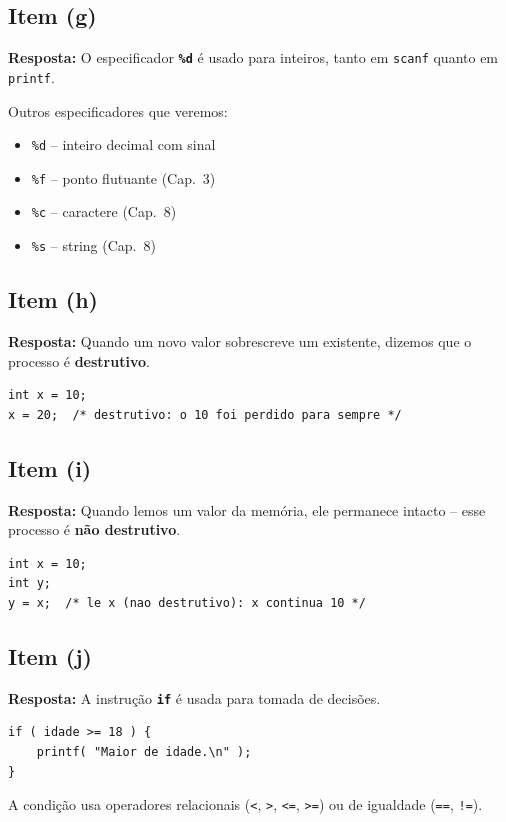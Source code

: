 \documentclass[12pt,a4paper]{article}
\begin{document}
\subsection*{Item (g)}
\begin{respostabox}
\textbf{Resposta:} O especificador \textcolor{deitelblue}{\textbf{\texttt{\%d}}}
é usado para inteiros, tanto em \texttt{scanf} quanto em \texttt{printf}.

Outros especificadores que veremos:
\begin{itemize}[noitemsep]
  \item \texttt{\%d} -- inteiro decimal com sinal
  \item \texttt{\%f} -- ponto flutuante (Cap.~3)
  \item \texttt{\%c} -- caractere (Cap.~8)
  \item \texttt{\%s} -- string (Cap.~8)
\end{itemize}
\end{respostabox}

\subsection*{Item (h)}
\begin{respostabox}
\textbf{Resposta:} Quando um novo valor sobrescreve um existente, dizemos que o
processo é \textcolor{deitelblue}{\textbf{destrutivo}}.

\begin{lstlisting}
int x = 10;
x = 20;  /* destrutivo: o 10 foi perdido para sempre */
\end{lstlisting}
\end{respostabox}

\subsection*{Item (i)}
\begin{respostabox}
\textbf{Resposta:} Quando lemos um valor da memória, ele permanece intacto -- esse
processo é \textcolor{deitelblue}{\textbf{não destrutivo}}.

\begin{lstlisting}
int x = 10;
int y;
y = x;  /* le x (nao destrutivo): x continua 10 */
\end{lstlisting}
\end{respostabox}

\subsection*{Item (j)}
\begin{respostabox}
\textbf{Resposta:} A instrução \textcolor{deitelblue}{\textbf{\texttt{if}}} é
usada para tomada de decisões.

\begin{lstlisting}
if ( idade >= 18 ) {
    printf( "Maior de idade.\n" );
}
\end{lstlisting}

A condição usa operadores relacionais (\texttt{<}, \texttt{>}, \texttt{<=},
\texttt{>=}) ou de igualdade (\texttt{==}, \texttt{!=}).
\end{respostabox}
\end{document}
